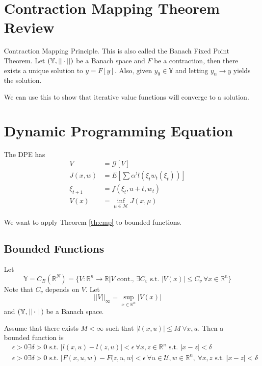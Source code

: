 \documentclass[lecture,12pt,]{pcms-l}
\begin{document}
\mainmatter
\setcounter{page}{1}

\lectureseries[\course]{\course}

\date{October 22, 2009}

\setaddress

\setcounter{lecture}{7}
\setcounter{chapter}{7}


\section{Contraction Mapping Theorem Review}
\begin{theorem}{Contraction Mapping Principle.}
\label{th:cmp}
This is also called the Banach Fixed Point Theorem. Let $(\mathbb{Y},||\cdot||)$ be a Banach space and $F$ be a contraction, then there exists a unique solution to $y=F[y]$. Also, given $y_0\in\mathbb{Y}$ and letting $y_n\to y$ yields the solution.
\end{theorem}

We can use this to show that iterative value functions will converge to a solution.

\section{Dynamic Programming Equation}
The DPE has
\begin{align*}
V&=\mathcal{G}[V] \\
J(x,w) &= E[\sum\alpha^tl(\xi_tw_t(\xi_t))] \\
\xi_{t+1} &= f(\xi_t,u+t,w_t) \\
V(x) &= \inf_{\mu\in\mathcal{M}}J(x,\mu)
\end{align*}

We want to apply Theorem \ref{th:cmp} to bounded functions.

\subsection{Bounded Functions}
Let
$$\mathbb{Y} = C_B(\mathbb{R}^N) = \{V:\mathbb{R}^n\to\mathbb{R} | V \text{ cont., } \exists C_v \text{ s.t. } |V(x)|\leq C_v ~\forall x\in\mathbb{R}^n\}$$
Note that $C_v$ depends on $V$. Let
$$||V||_\infty = \sup_{x\in\mathbb{R}^n}|V(x)|$$
and $(\mathbb{Y},||\cdot||)$ be a Banach space.

Assume that there exists $M<\infty$ such that $|l(x,u)|\leq M ~\forall x,u$. Then a bounded function is
\begin{align*}
&\epsilon>0 \exists \delta>0 \text{ s.t. } |l(x,u)-l(z,u)|<\epsilon ~\forall x,z\in\mathbb{R}^n \text{ s.t. } |x-z|<\delta \\
&\epsilon>0 \exists \delta>0 \text{ s.t. } |F(x,u,w)-F(z,u,w|<\epsilon ~\forall u\in\mathcal{U},w\in\mathbb{R}^n, ~\forall x,z \text{ s.t. } |x-z|<\delta
\end{align*}
\end{document}
